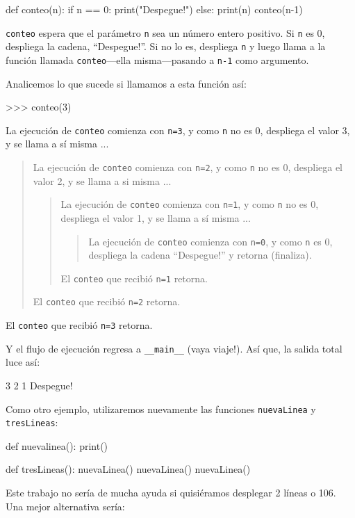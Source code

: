 \begin{pythoncode}
def conteo(n):
  if n == 0:
    print("Despegue!")
  else:
    print(n)
    conteo(n-1)
\end{pythoncode}

\texttt{conteo} espera que el parámetro \texttt{n} sea un número entero
positivo. Si \texttt{n} es 0, despliega la cadena, ``Despegue!''.
Si no lo es, despliega \texttt{n} y luego llama a la función llamada
\texttt{conteo}—ella misma—pasando a \texttt{n-1} como argumento.

Analicemos lo que sucede si llamamos a esta función así:
\begin{pyconcode}
>>> conteo(3)
\end{pyconcode}

La ejecución de \texttt{conteo} comienza con \texttt{n=3}, y como
\texttt{n} no es 0, despliega el valor 3, y se llama a sí misma ...
\begin{quote}
La ejecución de \texttt{conteo} comienza con \texttt{n=2}, y como
\texttt{n} no es 0, despliega el valor 2, y se llama a si misma ...

\begin{quote}
La ejecución de \texttt{conteo} comienza con \texttt{n=1}, y como
\texttt{n} no es 0, despliega el valor 1, y se llama a sí misma ...

\begin{quote}
La ejecución de \texttt{conteo} comienza con \texttt{n=0}, y como
\texttt{n} es 0, despliega la cadena ``Despegue!'' y retorna (finaliza). 
\end{quote}
El \texttt{conteo} que recibió \texttt{n=1} retorna. 
\end{quote}
El \texttt{conteo} que recibió \texttt{n=2} retorna. 
\end{quote}
El \texttt{conteo} que recibió \texttt{n=3} retorna.

Y el flujo de ejecución regresa a \texttt{\_\_main\_\_} (vaya viaje!).
Así que, la salida total luce así:
\begin{pyconcode}
3
2
1
Despegue!
\end{pyconcode}
Como otro ejemplo, utilizaremos nuevamente las funciones \texttt{nuevaLinea}
y \texttt{tresLineas}:

\begin{pythoncode}
def nuevalinea():
  print()

def tresLineas():
  nuevaLinea()
  nuevaLinea()
  nuevaLinea()
\end{pythoncode}

Este trabajo no sería de mucha ayuda si quisiéramos desplegar 2 líneas
o 106. Una mejor alternativa sería:

